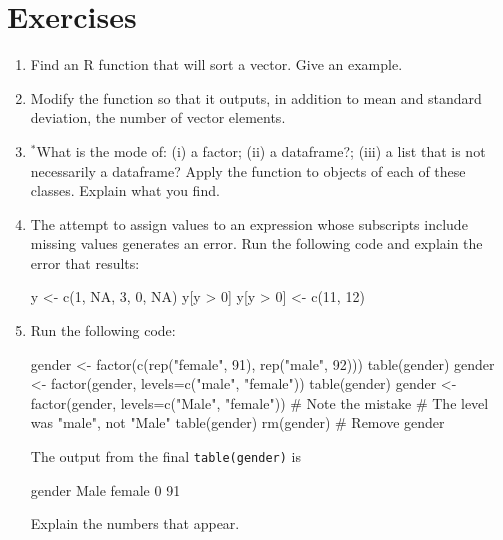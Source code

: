 \section{Exercises}\label{sec:objects-ex}


\begin{enumerate}

\item  Find an R function that will sort a vector. Give an example.

\item  Modify the function  so that it outputs,
in addition to mean and standard deviation, the number of
vector elements.

\item $^*$What is the mode of: (i) a factor; (ii) a dataframe?;
(iii) a list that is not necessarily a dataframe?
Apply the function  to objects of each
of these classes.  Explain what you find.

\item The attempt to assign values to an expression whose
subscripts include missing values generates an error.
Run the following code and explain the error that results:
\begin{Schunk}
\begin{Sinput}
y <- c(1, NA, 3, 0, NA)
y[y > 0]
y[y > 0] <- c(11, 12)
\end{Sinput}
\end{Schunk}

\item Run the following code:
\begin{fullwidth}

\begin{Schunk}
\begin{Sinput}
gender <- factor(c(rep("female", 91), rep("male", 92)))
table(gender)
gender <- factor(gender, levels=c("male", "female"))
table(gender)
gender <- factor(gender, levels=c("Male", "female")) # Note the mistake
                            # The level was "male", not "Male"
table(gender)
rm(gender)                  # Remove gender
\end{Sinput}
\end{Schunk}

\end{fullwidth}
The output from the final \verb!table(gender)! is

\begin{Schunk}
\begin{Soutput}
gender
  Male female 
     0     91 
\end{Soutput}
\end{Schunk}
Explain the numbers that appear.


\end{enumerate}
